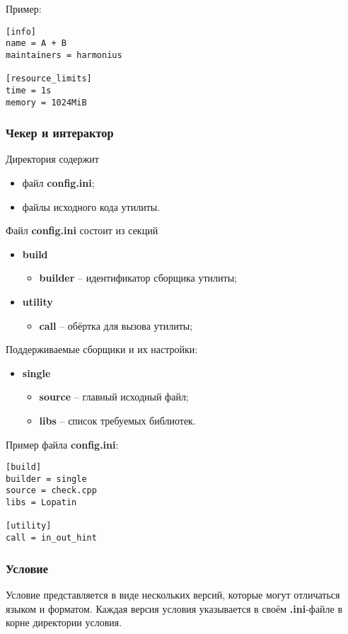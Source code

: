 Пример:
\begin{verbatim}
[info]
name = A + B
maintainers = harmonius

[resource_limits]
time = 1s
memory = 1024MiB
\end{verbatim}

\subsubsection{Чекер и интерактор}
Директория содержит
\begin{itemize}
    \item файл \textbf{config.ini};
    \item файлы исходного кода утилиты.
\end{itemize}

Файл \textbf{config.ini} состоит из секций
\begin{itemize}
    \item \textbf{build}
        \begin{itemize}
            \item \textbf{builder} -- идентификатор сборщика утилиты;
        \end{itemize}
    \item \textbf{utility}
        \begin{itemize}
            \item \textbf{call} -- обёртка для вызова утилиты;
        \end{itemize}
\end{itemize}

Поддерживаемые сборщики и их настройки:
\begin{itemize}
    \item \textbf{single}
        \begin{itemize}
            \item \textbf{source} -- главный исходный файл;
            \item \textbf{libs} -- список требуемых библиотек.
        \end{itemize}
\end{itemize}

Пример файла \textbf{config.ini}:
\begin{verbatim}
[build]
builder = single
source = check.cpp
libs = Lopatin

[utility]
call = in_out_hint
\end{verbatim}

\subsubsection{Условие}
Условие представляется в виде нескольких версий,
которые могут отличаться языком и форматом.
Каждая версия условия указывается в своём \textbf{.ini}-файле
в корне директории условия.

